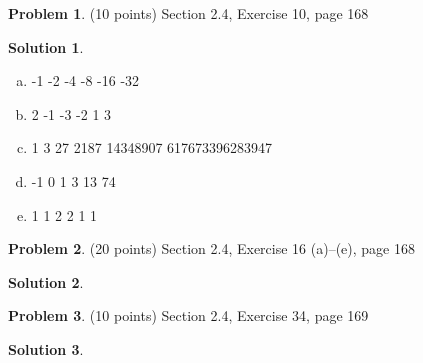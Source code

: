 \documentclass{article}
\theoremstyle{definition}
\newtheorem{problem}{Problem}
\newtheorem*{solution}{Solution}
\begin{document}
\begin{problem} (10 points)
Section 2.4, Exercise 10, page 168
\end{problem}
\begin{solution}
\begin{enumerate}[a)]\ \\
  \item 
                               -1
                               -2
                               -4
                               -8
                              -16
                              -32

  \item
                                2
                               -1
                               -3
                               -2
                               1
                               3

  
  \item
                               1
                               3
                               27
                              2187
                            14348907
                        617673396283947

  
  \item
                              -1
                               0
                               1
                               3
                               13
                               74

  
  \item
                               1
                               1
                               2
                               2
                               1
                               1

  

\end{enumerate}
\end{solution}

\begin{problem} (20 points)
Section 2.4, Exercise 16 (a)--(e), page 168
\end{problem}
\begin{solution} 
\end{solution}

\begin{problem} (10 points)
Section 2.4, Exercise 34, page 169
\end{problem}
\begin{solution} 
\end{solution}
\end{document}
